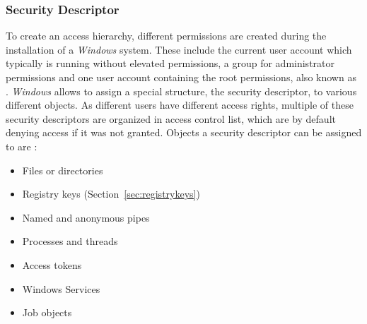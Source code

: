\subsubsection{Security Descriptor}
\label{sec:sd}
To create an access hierarchy, different permissions are created during the installation of a \emph{Windows} system. These include the current user account which typically is running without elevated permissions, a group for administrator permissions and one user account containing the root permissions, also known as  \cite{msdn_localsystem1, msdn_localsystem2}. \emph{Windows} allows to assign a special structure, the security descriptor, to various different objects. As different users have different access rights, multiple of these security descriptors are organized in access control list, which are by default denying access if it was not granted. Objects a security descriptor can be assigned to are \cite{msdn_sd}:
\begin{itemize}
\item Files or directories
\item Registry keys (Section~\ref{sec:registrykeys})
\item Named and anonymous pipes
\item Processes and threads
\item Access tokens
\item Windows Services
\item Job objects
\end{itemize}
